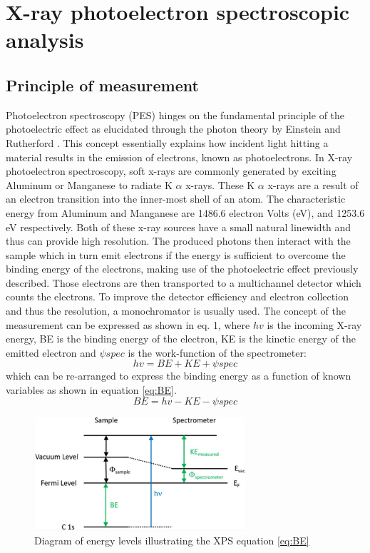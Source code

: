 \label{XPS_theory}
\section{X-ray photoelectron spectroscopic analysis}
\subsection{Principle of measurement}
Photoelectron spectroscopy (PES) hinges on the fundamental principle of the photoelectric effect  as elucidated through the photon theory by Einstein and Rutherford \cite{rutherford_xxxvii_1914, einstein_uber_1905}. This concept essentially explains how incident light hitting a material results in the emission of electrons, known as photoelectrons.
In X-ray photoelectron spectroscopy, soft x-rays are commonly generated by exciting Aluminum or Manganese to radiate K \(\alpha\) x-rays. These K $\alpha$ x-rays are a result of an electron transition into the inner-most shell of an atom. The characteristic energy from Aluminum and Manganese are 1486.6 electron Volts (eV), and 1253.6 eV respectively. Both of these x-ray sources have a small natural linewidth and thus can provide high resolution. The produced photons then interact with the sample which in turn emit electrons if the energy is sufficient to overcome the binding energy of the electrons, making use of the photoelectric effect previously described. Those electrons are then transported to a multichannel detector which counts the electrons. To improve the detector efficiency and electron collection and thus the resolution, a monochromator is usually used.\cite{stevie_introduction_2020} The concept of the measurement can be expressed as shown in eq. 1, where $hv$ is the incoming X-ray energy, BE is the binding energy of the electron, KE is the kinetic energy of the emitted electron and $\psi spec$ is the work-function of the spectrometer:
\begin{equation}
    hv = BE + KE + \psi spec
    \label{eq:hv}
\end{equation}
which can be re-arranged to express the binding energy as a function of known variables \cite{stevie_introduction_2020} as shown in equation \ref{eq:BE}.
\begin{equation}
    BE = hv- KE - \psi spec
    \label{eq:BE}
\end{equation}

\begin{figure}
    \centering
    \includegraphics[width=0.7\textwidth]{Figures/image4_3.jpeg}
    \caption{Diagram of energy levels illustrating the XPS  equation \ref{eq:BE}}
    \label{fig:enter-label}
\end{figure}



